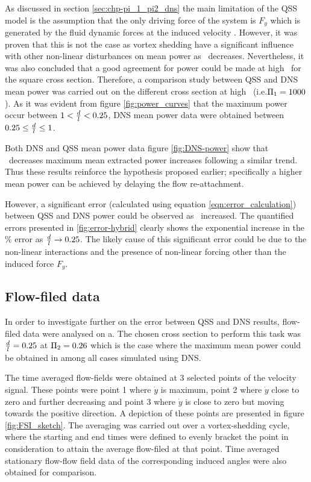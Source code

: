 As discussed in section \ref{sec:chp-pi_1_pi2_dns} the main limitation of the QSS model is the assumption that the only driving force of the system is $F_{y}$ which is generated by the fluid dynamic forces at the induced velocity . However, it was proven that this is not the case as vortex shedding have a significant influence with other non-linear disturbances on mean power as \massstiff\ decreases. Nevertheless, it was also concluded that a good agreement for power could be made at high \massstiff\ for the square cross section. Therefore, a comparison study between QSS and DNS mean power was carried out on the different cross section at high \massstiff\ (i.e.$\Pi_1=1000$). As it was evident from figure \ref{fig:power_curves} that the maximum power occur between $1<\frac{d}{l}<0.25$, DNS mean power data were obtained between $0.25\leq\frac{d}{l}\leq1$.   

Both  DNS and QSS mean power data figure \ref{fig:DNS-power} show that \ratio\ decreases maximum mean extracted power increases following a similar trend. Thus these results reinforce the hypothesis proposed earlier; specifically a higher mean power can be achieved by delaying the flow re-attachment. 

However, a significant error (calculated using equation \ref{eqn:error_calculation}) between QSS and DNS power could be observed as \ratio\ increased. The quantified errors presented in \ref{fig:error-hybrid} clearly shows the exponential increase in the $\%$ error as $\frac{d}{l} \rightarrow 0.25$. The likely cause of this significant error could be due to the non-linear interactions and the presence of non-linear forcing other than the induced force $F_{y}$.



 
\subsection{Flow-filed data}
 
 In order to investigate further on the error between QSS and DNS results, flow-filed data were analysed on a. The chosen cross section to perform this task was $\frac{d}{l}=0.25$ at $\Pi_2=0.26$ which is the case where the maximum mean power could be obtained in among all cases simulated using DNS. 
 


The time averaged flow-fields were obtained at 3 selected points of the velocity signal. These points were point 1 where $\dot{y}$ is maximum, point 2 where $\dot{y}$ close to zero and further decreasing and point 3 where $\dot{y}$ is close to zero but moving towards the positive direction. A depiction of these points are presented in figure \ref{fig:FSI_sketch}. The averaging was carried out over a vortex-shedding cycle, where the starting and end times were defined to evenly bracket the point in consideration to attain the average flow-filed at that point. Time averaged stationary flow-flow field data of the corresponding induced angles were also obtained for comparison.


